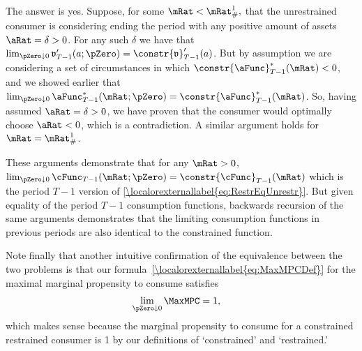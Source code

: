\documentclass[\econtexRoot/BufferStockTheory]{subfiles}
\begin{document}
The answer is yes.  Suppose, for some $\mRat < \mRat^{1}_{\#},$ that the
unrestrained consumer is considering ending the period with any
positive amount of assets $\aRat=\delta > 0$.  For any such $\delta$ we
have that $\lim_{\pZero  \downarrow 0} \mathfrak{v}_{T-1}^{\prime}(a;\pZero)=\constr{\mathfrak{v}}_{T-1}^{\prime}(a)$.
But by assumption we are considering a set of circumstances in which
$\constr{\aFunc}_{T-1}^{*}(\mRat) < 0$, and we showed earlier that
$\lim_{\pZero  \downarrow 0} \aFunc_{T-1}^{*}(\mRat;\pZero) = \constr{\aFunc}_{T-1}^{*}(\mRat)$.  So,
having assumed $\aRat = \delta > 0$, we have proven that the consumer
would optimally choose $\aRat < 0$, which is a contradiction.  A similar
argument holds for $\mRat = \mRat^{1}_{\#}$.

These arguments demonstrate that for any $\mRat>0$, $\lim_{\pZero
  \downarrow 0} \cFunc_{T-1}(\mRat;\pZero) =
\constr{\cFunc}_{T-1}(\mRat)$ which is the period $T-1$ version of
\eqref{\localorexternallabel{eq:RestrEqUnrestr}}.  But given equality of the period $T-1$
consumption functions, backwards recursion of the same arguments
demonstrates that the limiting consumption functions in previous
periods are also identical to the constrained function.

Note finally that another intuitive confirmation of the equivalence
between the two problems is that our formula~\eqref{\localorexternallabel{eq:MaxMPCDef}} for the maximal marginal
propensity to consume satisfies
\begin{eqnarray*}
  \lim_{\pZero \downarrow 0} \MaxMPC  & = 1,
\end{eqnarray*}
which makes sense because the marginal propensity to consume for a
constrained restrained consumer is 1 by our definitions of
`constrained' and `restrained.'

\onlyinsubfile{}
\end{document}

